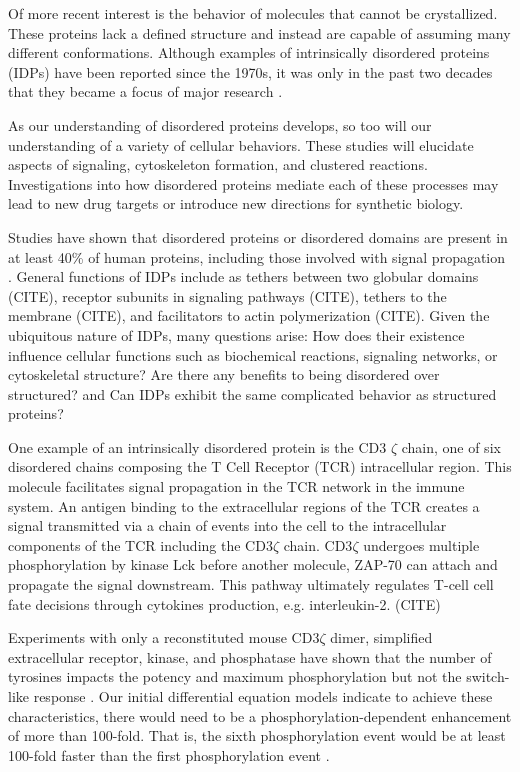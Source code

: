 \documentclass[../AdvancementSummary.tex]{subfiles}
\begin{document}
Of more recent interest is the behavior of molecules that cannot be crystallized. These proteins lack a defined structure and instead are capable of assuming many different conformations. Although examples of intrinsically disordered proteins (IDPs) have been reported since the 1970s, it was only in the past two decades that they became a focus of major research \cite{Dunker2008}.  

As our understanding of disordered proteins develops, so too will our understanding of a variety of cellular behaviors. These studies will elucidate aspects of signaling, cytoskeleton formation, and clustered reactions. Investigations into how disordered proteins mediate each of these processes may lead to new drug targets or introduce new directions for synthetic biology.

Studies have shown that disordered proteins or disordered domains are present in at least 40\% of human proteins, including those involved with signal propagation \cite{Tompa2012}. General functions of IDPs include as tethers between two globular domains (CITE), receptor subunits in signaling pathways (CITE), tethers to the membrane (CITE), and facilitators to actin polymerization (CITE). Given the ubiquitous nature of IDPs, many questions arise: How does their existence influence cellular functions such as biochemical reactions, signaling networks, or cytoskeletal structure?  Are there any benefits to being disordered over structured? and Can IDPs exhibit the same complicated behavior as structured proteins?

One example of an intrinsically disordered protein is the CD3 $\zeta$ chain, one of six disordered chains composing the T Cell Receptor (TCR) intracellular region. This molecule facilitates signal propagation in the TCR network in the immune system.  An antigen binding to the extracellular regions of the TCR creates a signal transmitted via a chain of events into the cell to the intracellular components of the TCR including the CD3$\zeta$ chain.  CD3$\zeta$ undergoes multiple phosphorylation by kinase Lck before another molecule, ZAP-70 can attach and propagate the signal downstream. This pathway ultimately regulates T-cell cell fate decisions through cytokines production, e.g. interleukin-2. (CITE)


Experiments with only a reconstituted mouse CD3$\zeta$ dimer, simplified extracellular receptor, kinase, and phosphatase have shown that the number of tyrosines impacts the potency and maximum phosphorylation but not the switch-like response \cite{Mukhopadhyay2016}. Our initial differential equation models indicate to achieve these characteristics, there would need to be a phosphorylation-dependent enhancement of more than 100-fold. That is, the sixth phosphorylation event would be at least 100-fold faster than the first phosphorylation event \cite{Mukhopadhyay2016}. 
\end{document}

